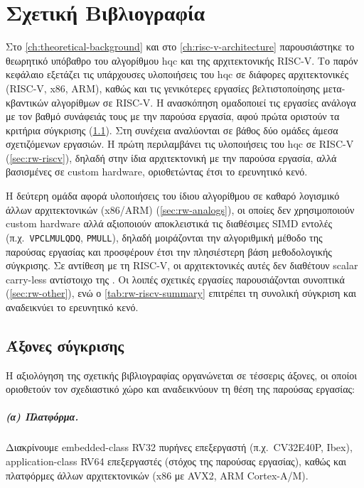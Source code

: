 \chapter{Σχετική Βιβλιογραφία}
\label{ch:related-work}

Στο \cref{ch:theoretical-background} και στο \cref{ch:risc-v-architecture}
παρουσιάστηκε το θεωρητικό υπόβαθρο του αλγορίθμου \gls{hqc} και της αρχιτεκτονικής
RISC-V. Το παρόν κεφάλαιο εξετάζει τις υπάρχουσες υλοποιήσεις του
\gls{hqc} σε διάφορες αρχιτεκτονικές (RISC-V, x86, ARM), 
καθώς και τις γενικότερες εργασίες βελτιστοποίησης μετα-κβαντικών
αλγορίθμων σε RISC-V. Η ανασκόπηση ομαδοποιεί τις εργασίες ανάλογα με τον βαθμό
συνάφειάς τους με την παρούσα εργασία, αφού πρώτα οριστούν τα κριτήρια σύγκρισης
(\cref{sec:rw-axes}). Στη συνέχεια αναλύονται σε βάθος δύο ομάδες άμεσα σχετιζόμενων εργασιών. Η
πρώτη περιλαμβάνει τις υλοποιήσεις του \gls{hqc} σε RISC-V
(\cref{sec:rw-riscv}), δηλαδή στην ίδια αρχιτεκτονική με την παρούσα εργασία, αλλά
βασισμένες σε custom hardware, οριοθετώντας έτσι το ερευνητικό κενό.

Η δεύτερη ομάδα αφορά υλοποιήσεις του ίδιου αλγορίθμου σε καθαρό λογισμικό άλλων αρχιτεκτονικών (x86/ARM)
(\cref{sec:rw-analogs}), οι οποίες δεν χρησιμοποιούν custom hardware αλλά
αξιοποιούν αποκλειστικά τις διαθέσιμες SIMD εντολές (π.χ.\ 
\texttt{VPCLMULQDQ}, \texttt{PMULL}), δηλαδή μοιράζονται την αλγοριθμική μέθοδο 
της παρούσας εργασίας και προσφέρουν έτσι την πλησιέστερη βάση μεθοδολογικής 
σύγκρισης. Σε αντίθεση με τη RISC-V, οι αρχιτεκτονικές αυτές δεν διαθέτουν scalar 
carry-less αντίστοιχο της \insn{clmul}. Οι λοιπές σχετικές εργασίες παρουσιάζονται συνοπτικά
(\cref{sec:rw-other}), ενώ ο \cref{tab:rw-riscv-summary} επιτρέπει τη συνολική
σύγκριση και αναδεικνύει το ερευνητικό κενό.

\section{Άξονες σύγκρισης}
\label{sec:rw-axes}

Η αξιολόγηση της σχετικής βιβλιογραφίας οργανώνεται σε τέσσερις άξονες, οι
οποίοι οριοθετούν τον σχεδιαστικό χώρο και αναδεικνύουν τη θέση της παρούσας
εργασίας:

\paragraph{(α) Πλατφόρμα.}
Διακρίνουμε embedded-class RV32 πυρήνες επεξεργαστή (π.χ.\ CV32E40P, Ibex),
application-class RV64 επεξεργαστές (στόχος της παρούσας εργασίας),
καθώς και πλατφόρμες άλλων αρχιτεκτονικών (x86 με AVX2, ARM Cortex-A/M).

